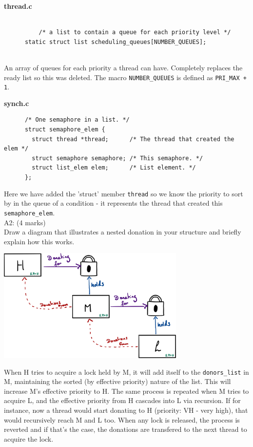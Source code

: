 \documentclass[11pt, a4paper]{article}
\begin{document}
		\begin{center}\textbf{thread.c}\end{center}
		\begin{verbatim}
		
	      /* a list to contain a queue for each priority level */
      static struct list scheduling_queues[NUMBER_QUEUES];
        
		\end{verbatim}		
        An array of queues for each priority a thread can have. Completely replaces the ready list so this was deleted. The macro \verb+NUMBER_QUEUES+ is defined
        as \verb!PRI_MAX + 1!.

    \vskip 1in

		\begin{center}\textbf{synch.c}\end{center}
		\begin{verbatim}
      /* One semaphore in a list. */
      struct semaphore_elem {
        struct thread *thread;      /* The thread that created the elem */
        struct semaphore semaphore; /* This semaphore. */
        struct list_elem elem;      /* List element. */
      };

		\end{verbatim}
		Here we have added the 'struct' member \verb+thread+ so we know the priority to sort by in the queue
		of a condition - it represents the thread that
		created this \verb+semaphore_elem+.\bigskip\\
		A2: (4 marks)\\
		Draw a diagram that illustrates a nested donation in your structure and briefly explain how 
		this works.
		
		\begin{center}
			\includegraphics[width=0.7\textwidth]{Diagram.jpeg}
		\end{center}
		When H tries to acquire a lock held by M, it will add itself to the \verb+donors_list+ in M, maintaining the sorted (by effective priority) nature of the list. This will increase M's effective priority to 
    H. The same process is repeated when M tries to acquire L, and the effective priority from H cascades into L via recursion. If for instance,
		now a thread would start donating to H (priority: VH - very high), that would recursively reach M and L too. When any lock is released, the process is reverted and if that's the case, the donations are
		transfered to the next thread to acquire the lock.
\end{document}

